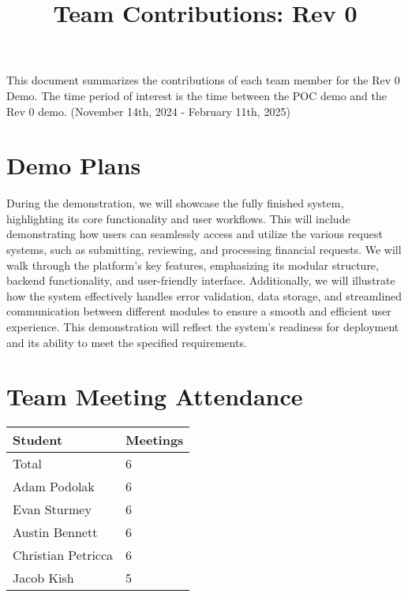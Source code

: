 \documentclass{article}
\title{Team Contributions: Rev 0\\\progname}
\author{\authname}
\date{}
\begin{document}
\maketitle

This document summarizes the contributions of each team member for the Rev 0
Demo.  The time period of interest is the time between the POC demo and the Rev
0 demo. (November 14th, 2024 - February 11th, 2025)

\section{Demo Plans}

During the demonstration, we will showcase the fully finished system, highlighting its core functionality and user workflows. This will include demonstrating how users can seamlessly access and utilize the various request systems, such as submitting, reviewing, and processing financial requests. We will walk through the platform's key features, emphasizing its modular structure, backend functionality, and user-friendly interface. Additionally, we will illustrate how the system effectively handles error validation, data storage, and streamlined communication between different modules to ensure a smooth and efficient user experience. This demonstration will reflect the system’s readiness for deployment and its ability to meet the specified requirements.\\ 


\section{Team Meeting Attendance}


\begin{table}[H]
\centering
\begin{tabular}{ll}
\toprule
\textbf{Student} & \textbf{Meetings}\\
\midrule
Total & 6\\
Adam Podolak & 6\\
Evan Sturmey & 6\\
Austin Bennett & 6\\
Christian Petricca & 6\\
Jacob Kish & 5\\
\bottomrule
\end{tabular}
\end{table}
\end{document}
